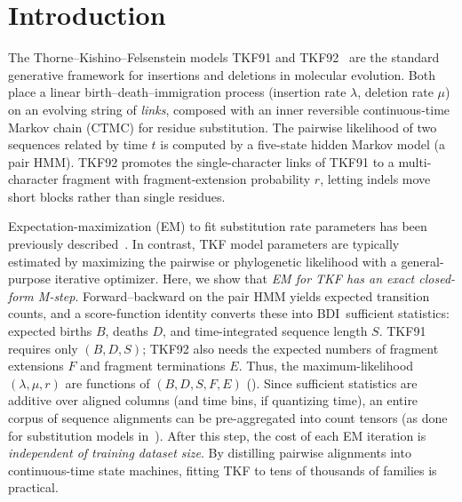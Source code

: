 \documentclass{article}
\newcommand{\BDI}{\textsc{BDI}}
\newcommand{\ins}{\lambda}
\newcommand{\del}{\mu}
\newcommand{\ext}{r}
\begin{document}

\section{Introduction}
\label{sec:intro}

The Thorne--Kishino--Felsenstein models TKF91 and
TKF92~\cite{ThorneEtAl91,ThorneEtAl92} are the standard generative
framework for insertions and deletions in molecular evolution. Both
place a linear birth--death--immigration process (insertion rate $\ins$,
deletion rate $\del$) on an evolving string of \emph{links}, composed 
with an inner reversible continuous-time Markov chain
(CTMC) for residue substitution. The pairwise likelihood of two
sequences related by time $t$ is computed by a five-state hidden Markov
model (a pair HMM). TKF92 promotes the single-character links of
TKF91 to a multi-character fragment with fragment-extension
probability $\ext$, letting indels move short blocks rather than single
residues.

Expectation-maximization (EM) to fit substitution rate parameters has been previously
described~\cite{HolmesRubin2002,HobolthJensen2005,HobolthJensen2011}.
In contrast, TKF model parameters are typically estimated by maximizing
the pairwise or phylogenetic likelihood with a general-purpose iterative
optimizer. Here, we show that \emph{EM for TKF has an 
exact closed-form M-step}. Forward--backward on the pair HMM yields 
expected transition counts, and a score-function identity converts these
into \BDI\ sufficient statistics: expected births $B$, deaths $D$, and
time-integrated sequence length $S$. TKF91 requires only $(B,D,S)$; 
TKF92 also needs the expected numbers of fragment extensions 
$F$ and fragment terminations $E$. Thus, the maximum-likelihood
$(\ins,\del,\ext)$ are functions of $(B,D,S,F,E)$
().
Since sufficient statistics are additive over aligned columns (and time bins, if quantizing time), 
an entire corpus of sequence alignments can be pre-aggregated into count tensors 
(as done for substitution models in~\cite{Prillo2022CherryML}). 
After this step, the cost of each EM iteration is 
\emph{independent of training dataset size}. By distilling pairwise 
alignments into continuous-time state machines, fitting TKF to tens 
of thousands of families is practical.
\end{document}
